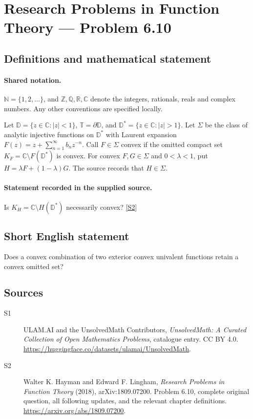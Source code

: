 \documentclass[11pt]{book}
\newcommand{\sref}[2]{\hyperlink{source:#1:#2}{[S#2]}}
\begin{document}
\section{Research Problems in Function Theory — Problem 6.10}\label{statement}

\subsection{Definitions and mathematical statement}

\paragraph{Shared notation.}$\mathbb N=\{1,2,\ldots\}$, and $\mathbb Z,\mathbb Q,\mathbb R,\mathbb C$ denote the integers, rationals, reals and complex numbers. Any other conventions are specified locally.


Let $\mathbb D=\{z\in\mathbb C:|z|<1\}$, $\mathbb T=\partial\mathbb D$, and $\mathbb D^*=\{z\in\mathbb C:|z|>1\}$. Let $\Sigma$ be the class of analytic injective functions on $\mathbb D^*$ with Laurent expansion $F(z)=z+\sum_{n=1}^{\infty}b_nz^{-n}$. Call $F\in\Sigma$ convex if the omitted compact set $K_F=\mathbb C\setminus F(\mathbb D^*)$ is convex. For convex $F,G\in\Sigma$ and $0<\lambda<1$, put $H=\lambda F+(1-\lambda)G$. The source records that $H\in\Sigma$.
\paragraph{Statement recorded in the supplied source.}
Is $K_H=\mathbb C\setminus H(\mathbb D^*)$ necessarily convex? \sref{statement}{2}
\subsection{Short English statement}
Does a convex combination of two exterior convex univalent functions retain a convex omitted set?
\subsection{Sources}
\begin{description}
\item[\hypertarget{source:statement:1}{S1}] ULAM.AI and the UnsolvedMath Contributors, \emph{UnsolvedMath: A Curated Collection of Open Mathematics Problems}, catalogue entry. CC BY 4.0. \url{https://huggingface.co/datasets/ulamai/UnsolvedMath}.
\item[\hypertarget{source:statement:2}{S2}] Walter K. Hayman and Edward F. Lingham, \emph{Research Problems in Function Theory} (2018), arXiv:1809.07200. Problem 6.10, complete original question, all following updates, and the relevant chapter definitions. \url{https://arxiv.org/abs/1809.07200}.
\end{description}
\label{end:statement}
\end{document}
